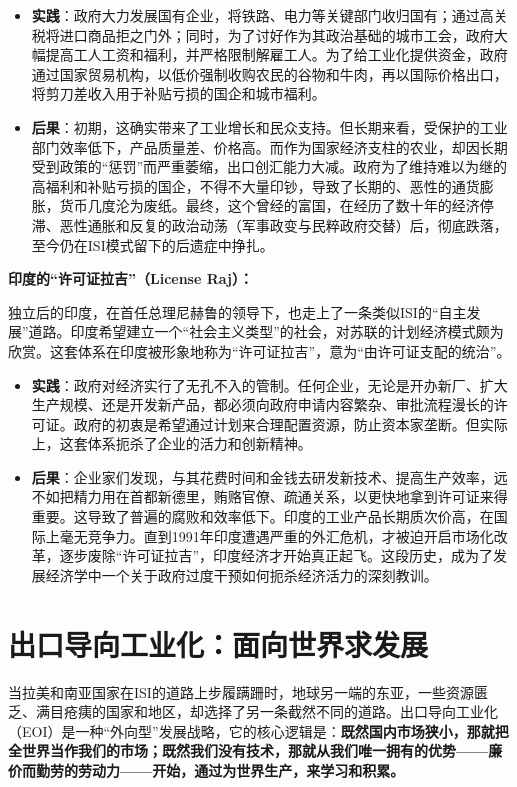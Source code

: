 \begin{itemize}
    \item \textbf{实践}：政府大力发展国有企业，将铁路、电力等关键部门收归国有；通过高关税将进口商品拒之门外；同时，为了讨好作为其政治基础的城市工会，政府大幅提高工人工资和福利，并严格限制解雇工人。为了给工业化提供资金，政府通过国家贸易机构，以低价强制收购农民的谷物和牛肉，再以国际价格出口，将剪刀差收入用于补贴亏损的国企和城市福利。
    \item \textbf{后果}：初期，这确实带来了工业增长和民众支持。但长期来看，受保护的工业部门效率低下，产品质量差、价格高。而作为国家经济支柱的农业，却因长期受到政策的“惩罚”而严重萎缩，出口创汇能力大减。政府为了维持难以为继的高福利和补贴亏损的国企，不得不大量印钞，导致了长期的、恶性的通货膨胀，货币几度沦为废纸。最终，这个曾经的富国，在经历了数十年的经济停滞、恶性通胀和反复的政治动荡（军事政变与民粹政府交替）后，彻底跌落，至今仍在ISI模式留下的后遗症中挣扎。
\end{itemize}

\textbf{印度的“许可证拉吉”（License Raj）：}

独立后的印度，在首任总理尼赫鲁的领导下，也走上了一条类似ISI的“自主发展”道路。印度希望建立一个“社会主义类型”的社会，对苏联的计划经济模式颇为欣赏。这套体系在印度被形象地称为“许可证拉吉”，意为“由许可证支配的统治”。

\begin{itemize}
    \item \textbf{实践}：政府对经济实行了无孔不入的管制。任何企业，无论是开办新厂、扩大生产规模、还是开发新产品，都必须向政府申请内容繁杂、审批流程漫长的许可证。政府的初衷是希望通过计划来合理配置资源，防止资本家垄断。但实际上，这套体系扼杀了企业的活力和创新精神。
    \item \textbf{后果}：企业家们发现，与其花费时间和金钱去研发新技术、提高生产效率，远不如把精力用在首都新德里，贿赂官僚、疏通关系，以更快地拿到许可证来得重要。这导致了普遍的腐败和效率低下。印度的工业产品长期质次价高，在国际上毫无竞争力。直到1991年印度遭遇严重的外汇危机，才被迫开启市场化改革，逐步废除“许可证拉吉”，印度经济才开始真正起飞。这段历史，成为了发展经济学中一个关于政府过度干预如何扼杀经济活力的深刻教训。
\end{itemize}

\section{出口导向工业化：面向世界求发展}

当拉美和南亚国家在ISI的道路上步履蹒跚时，地球另一端的东亚，一些资源匮乏、满目疮痍的国家和地区，却选择了另一条截然不同的道路。出口导向工业化（EOI）是一种“外向型”发展战略，它的核心逻辑是：\textbf{既然国内市场狭小，那就把全世界当作我们的市场；既然我们没有技术，那就从我们唯一拥有的优势——廉价而勤劳的劳动力——开始，通过为世界生产，来学习和积累。}

